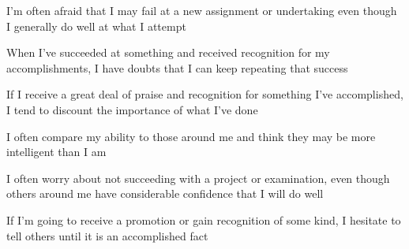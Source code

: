 \documentclass[aspectratio=169]{beamer}
\begin{document}
\begin{frame}
  \begin{center}
    \Huge     I’m  often  afraid  that  I  may  fail  at  a  new  assignment  or  undertaking  even  though  I  generally  do  well  at  what  I
    attempt
  \end{center}
\end{frame}

\begin{frame}
  \begin{center}
    \Huge   When  I’ve  succeeded  at  something  and  received  recognition  for  my  accomplishments,  I  have  doubts  that I can keep repeating that success
  \end{center}
\end{frame}

\begin{frame}
  \begin{center}
    \Huge     If  I  receive  a  great  deal  of  praise  and  recognition  for  something  I’ve  accomplished,  I  tend  to  discount  the  importance
    of  what  I’ve  done
  \end{center}
\end{frame}

\begin{frame}
  \begin{center}
    \Huge     I often compare my ability to those around me and think they may be more intelligent than I am
  \end{center}
\end{frame}

\begin{frame}
  \begin{center}
    \Huge      I often worry about not succeeding with a project or examination, even though others around me have considerable
    confidence that I will do well
  \end{center}
\end{frame}

\begin{frame}
  \begin{center}
    \Huge       If  I’m  going  to  receive  a  promotion  or  gain  recognition  of  some  kind,  I  hesitate  to  tell  others  until  it  is  an
    accomplished fact
  \end{center}
\end{frame}
\end{document}
